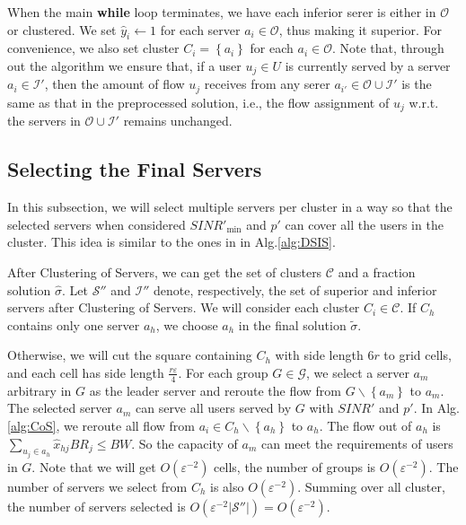 \documentclass[journal]{IEEEtran}
\begin{document}
When the main \textbf{while} loop terminates, we have each inferior serer is either in $\mathcal{O}$ or clustered. We set $\widehat y_i \leftarrow 1$ for each server $a_i\in \mathcal{O}$, thus making it superior. For convenience, we also set cluster $C_i=\left\{a_i\right\}$ for each $a_i\in \mathcal{O}$. Note that, through out the algorithm we ensure that, if a user $u_j \in U$ is currently served by a server $a_i \in \mathcal{I}'$, then the amount of flow $u_j$ receives from any serer $a_{i'}\in \mathcal{O}\cup\mathcal{I}'$ is the same as that in the preprocessed solution, i.e., the flow assignment of $u_j$ w.r.t. the servers in $\mathcal{O}\cup\mathcal{I}'$ remains unchanged.


\subsection{Selecting the Final Servers}
In this subsection, we will select multiple servers per cluster in a way so that the selected servers when considered $SINR'_{\min}$ and $p'$ can cover all the users in the cluster. This idea is similar to the ones in in Alg.\ref{alg:DSIS}.


After Clustering of Servers, we can get the set of clusters $\mathcal{C}$ and a fraction solution $\widehat{\sigma}$. Let $\mathcal{S}''$ and $\mathcal{I}''$ denote, respectively, the set of superior and inferior servers after Clustering of Servers. We will consider each cluster $C_i \in \mathcal{C}$. If $C_h$ contains only one server $a_h$, we choose $a_h $ in the final solution $\widetilde{\sigma}$.


Otherwise, we will cut the square containing $C_h$ with side length $6r$ to grid cells, and each cell has side length $\frac{r\varepsilon}{4}$. For each group $G\in\mathcal{G}$, we select a server $a_m$ arbitrary in $G$ as the leader server and reroute the flow from $G\backslash\left\{a_m\right\}$ to $a_m$. The selected server $a_m$ can serve all users served by $G$ with $SINR'$ and $p'$. In Alg.\ref{alg:CoS}, we reroute all flow from $a_i \in C_h\backslash \left\{a_h\right\}$ to $a_h$. The flow out of $a_h $ is $ \sum\nolimits_{u_j \in a_h}{\widehat{x}_{hj}BR_j} \le BW $. So the capacity of $a_m$ can meet the requirements of users in $G$. Note that we will get $O(\varepsilon^{-2})$ cells, the number of groups is $O(\varepsilon^{-2})$. The number of servers we select from $C_h$ is also $O(\varepsilon^{-2})$. Summing over all cluster, the number of servers selected is $O(\varepsilon^{-2}\left| {\mathcal{S}''} \right|)=O(\varepsilon^{-2})$.
\end{document}
